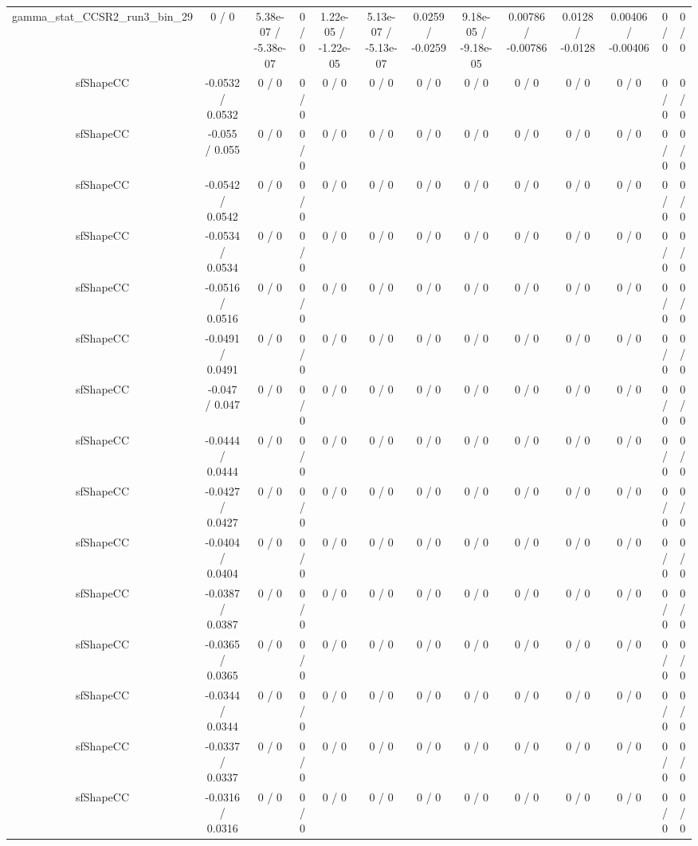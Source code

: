 \documentclass[10pt]{article}
\begin{document}
\begin{table}[htbp]
\begin{center}
\begin{tabular}{|c|c|c|c|c|c|c|c|c|c|c|c|c|}
  gamma_stat_CCSR2_run3_bin_29 & 0 / 0 & 5.38e-07 / -5.38e-07 & 0 / 0 & 1.22e-05 / -1.22e-05 & 5.13e-07 / -5.13e-07 & 0.0259 / -0.0259 & 9.18e-05 / -9.18e-05 & 0.00786 / -0.00786 & 0.0128 / -0.0128 & 0.00406 / -0.00406 & 0 / 0 & 0 / 0 \\ 
  sfShapeCC & -0.0532 / 0.0532 & 0 / 0 & 0 / 0 & 0 / 0 & 0 / 0 & 0 / 0 & 0 / 0 & 0 / 0 & 0 / 0 & 0 / 0 & 0 / 0 & 0 / 0 \\ 
  sfShapeCC & -0.055 / 0.055 & 0 / 0 & 0 / 0 & 0 / 0 & 0 / 0 & 0 / 0 & 0 / 0 & 0 / 0 & 0 / 0 & 0 / 0 & 0 / 0 & 0 / 0 \\ 
  sfShapeCC & -0.0542 / 0.0542 & 0 / 0 & 0 / 0 & 0 / 0 & 0 / 0 & 0 / 0 & 0 / 0 & 0 / 0 & 0 / 0 & 0 / 0 & 0 / 0 & 0 / 0 \\ 
  sfShapeCC & -0.0534 / 0.0534 & 0 / 0 & 0 / 0 & 0 / 0 & 0 / 0 & 0 / 0 & 0 / 0 & 0 / 0 & 0 / 0 & 0 / 0 & 0 / 0 & 0 / 0 \\ 
  sfShapeCC & -0.0516 / 0.0516 & 0 / 0 & 0 / 0 & 0 / 0 & 0 / 0 & 0 / 0 & 0 / 0 & 0 / 0 & 0 / 0 & 0 / 0 & 0 / 0 & 0 / 0 \\ 
  sfShapeCC & -0.0491 / 0.0491 & 0 / 0 & 0 / 0 & 0 / 0 & 0 / 0 & 0 / 0 & 0 / 0 & 0 / 0 & 0 / 0 & 0 / 0 & 0 / 0 & 0 / 0 \\ 
  sfShapeCC & -0.047 / 0.047 & 0 / 0 & 0 / 0 & 0 / 0 & 0 / 0 & 0 / 0 & 0 / 0 & 0 / 0 & 0 / 0 & 0 / 0 & 0 / 0 & 0 / 0 \\ 
  sfShapeCC & -0.0444 / 0.0444 & 0 / 0 & 0 / 0 & 0 / 0 & 0 / 0 & 0 / 0 & 0 / 0 & 0 / 0 & 0 / 0 & 0 / 0 & 0 / 0 & 0 / 0 \\ 
  sfShapeCC & -0.0427 / 0.0427 & 0 / 0 & 0 / 0 & 0 / 0 & 0 / 0 & 0 / 0 & 0 / 0 & 0 / 0 & 0 / 0 & 0 / 0 & 0 / 0 & 0 / 0 \\ 
  sfShapeCC & -0.0404 / 0.0404 & 0 / 0 & 0 / 0 & 0 / 0 & 0 / 0 & 0 / 0 & 0 / 0 & 0 / 0 & 0 / 0 & 0 / 0 & 0 / 0 & 0 / 0 \\ 
  sfShapeCC & -0.0387 / 0.0387 & 0 / 0 & 0 / 0 & 0 / 0 & 0 / 0 & 0 / 0 & 0 / 0 & 0 / 0 & 0 / 0 & 0 / 0 & 0 / 0 & 0 / 0 \\ 
  sfShapeCC & -0.0365 / 0.0365 & 0 / 0 & 0 / 0 & 0 / 0 & 0 / 0 & 0 / 0 & 0 / 0 & 0 / 0 & 0 / 0 & 0 / 0 & 0 / 0 & 0 / 0 \\ 
  sfShapeCC & -0.0344 / 0.0344 & 0 / 0 & 0 / 0 & 0 / 0 & 0 / 0 & 0 / 0 & 0 / 0 & 0 / 0 & 0 / 0 & 0 / 0 & 0 / 0 & 0 / 0 \\ 
  sfShapeCC & -0.0337 / 0.0337 & 0 / 0 & 0 / 0 & 0 / 0 & 0 / 0 & 0 / 0 & 0 / 0 & 0 / 0 & 0 / 0 & 0 / 0 & 0 / 0 & 0 / 0 \\ 
  sfShapeCC & -0.0316 / 0.0316 & 0 / 0 & 0 / 0 & 0 / 0 & 0 / 0 & 0 / 0 & 0 / 0 & 0 / 0 & 0 / 0 & 0 / 0 & 0 / 0 & 0 / 0 \\ 

\end{tabular}
\end{center}
\end{table}
\end{document}
